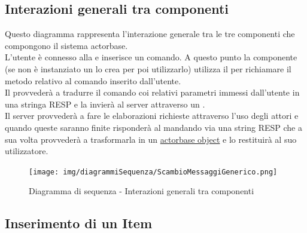 \documentclass{scalatekids-article}
\begin{document}
\subsection{Interazioni generali tra componenti}
Questo diagramma rappresenta l'interazione generale tra le tre componenti che 
compongono il sistema actorbase.\\
L'utente è connesso alla  e inserisce un comando. A questo punto la componente  (se non è instanziato un  lo crea per poi utilizzarlo) utilizza il  per richiamare il metodo relativo al comando inserito dall'utente.\\Il {} provvederà a tradurre il comando coi relativi parametri immessi dall'utente in una stringa RESP e la invierà al server attraverso un .\\ %
Il server provvederà a fare le elaborazioni richieste attraverso l'uso degli attori 
e quando queste saranno finite risponderà al  mandando via  una string RESP che a sua volta provvederà a trasformarla in un 
\hyperref[sec:driver::actorbasedata::actorbaseobject]{actorbase object} e lo restituirà al suo utilizzatore.\\ %
\begin{figure}[H]
  \begin{center}
    \texttt{[image: img/diagrammiSequenza/ScambioMessaggiGenerico.png]}
    \caption{Diagramma di sequenza - Interazioni generali tra componenti}
  \end{center}
\end{figure}

\subsection{Inserimento di un Item}
\end{document}
